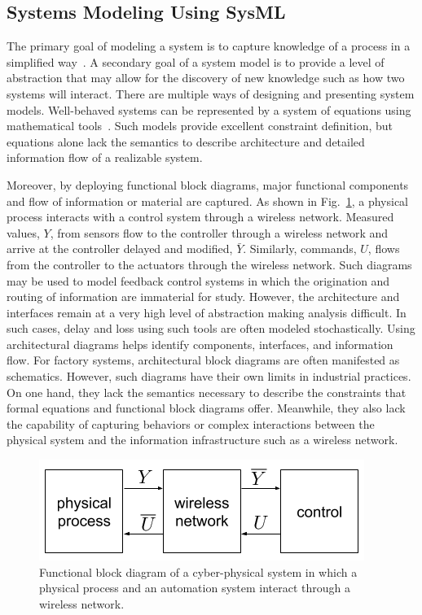 \subsection{Systems Modeling Using SysML} \label{sysml:sec:systemsmodeling}

The primary goal of modeling a system is to capture knowledge of a process in a simplified way~\cite{SysModel2004}. A secondary goal of a system model is to provide a level of abstraction that may allow for the discovery of new knowledge such as how two systems will interact. There are multiple ways of designing and presenting system models. Well-behaved systems can be represented by a system of equations using mathematical tools~\cite{SimModel1999}. Such models provide excellent constraint definition, but equations alone lack the semantics to describe architecture and detailed information flow of a realizable system.

Moreover, by deploying functional block diagrams, major functional components and flow of information or material are captured. As shown in Fig.~\ref{sysml:fig:fbd-system}, a physical process interacts with a control system through a wireless network.  Measured values, $Y$, from sensors flow to the controller through a wireless network and arrive at the controller delayed and modified, $\bar{Y}$. Similarly, commands, $U$, flows from the controller to the actuators through the wireless network. Such diagrams may be used to model feedback control systems in which the origination and routing of information are immaterial for study. However, the architecture and interfaces remain at a very high level of abstraction making analysis difficult. In such cases, delay and loss using such tools are often modeled stochastically. Using architectural diagrams helps identify components, interfaces, and information flow. For factory systems, architectural block diagrams are often manifested as schematics. However, such diagrams have their own limits in industrial practices. On one hand, they lack the semantics necessary to describe the constraints that formal equations and functional block diagrams offer. Meanwhile, they also lack the capability of capturing behaviors or complex interactions between the physical system and the information infrastructure such as a wireless network. 

\begin{figure}
	\centering
	\includegraphics[width=0.65\columnwidth]{./chapter-sysml/diagrams/fbd-system}
	\caption{Functional block diagram of a cyber-physical system in which a physical process and an automation system interact through a wireless network.}
	\label{sysml:fig:fbd-system}
\end{figure}


